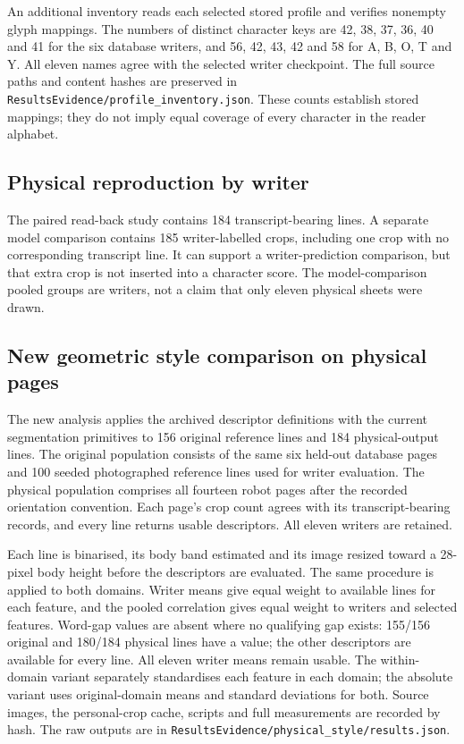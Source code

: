 An additional inventory reads each selected stored profile and verifies nonempty glyph mappings. The numbers of distinct character keys are 42, 38, 37, 36, 40 and 41 for the six database writers, and 56, 42, 43, 42 and 58 for A, B, O, T and Y. All eleven names agree with the selected writer checkpoint. The full source paths and content hashes are preserved in \texttt{ResultsEvidence/profile\_inventory.json}. These counts establish stored mappings; they do not imply equal coverage of every character in the reader alphabet.

\subsection{Physical reproduction by writer}

The paired read-back study contains 184 transcript-bearing lines. A separate model comparison contains 185 writer-labelled crops, including one crop with no corresponding transcript line. It can support a writer-prediction comparison, but that extra crop is not inserted into a character score. The model-comparison pooled groups are writers, not a claim that only eleven physical sheets were drawn.

\subsection{New geometric style comparison on physical pages}
\label{app:res-physical-style}
The new analysis applies the archived descriptor definitions with the current segmentation primitives to 156 original reference lines and 184 physical-output lines. The original population consists of the same six held-out database pages and 100 seeded photographed reference lines used for writer evaluation. The physical population comprises all fourteen robot pages after the recorded orientation convention. Each page's crop count agrees with its transcript-bearing records, and every line returns usable descriptors. All eleven writers are retained.

Each line is binarised, its body band estimated and its image resized toward a 28-pixel body height before the descriptors are evaluated. The same procedure is applied to both domains. Writer means give equal weight to available lines for each feature, and the pooled correlation gives equal weight to writers and selected features. Word-gap values are absent where no qualifying gap exists: 155/156 original and 180/184 physical lines have a value; the other descriptors are available for every line. All eleven writer means remain usable. The within-domain variant separately standardises each feature in each domain; the absolute variant uses original-domain means and standard deviations for both. Source images, the personal-crop cache, scripts and full measurements are recorded by hash. The raw outputs are in \texttt{ResultsEvidence/physical\_style/results.json}.

